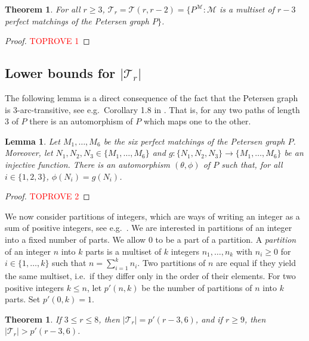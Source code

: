 \documentclass[a4paper,11pt]{article}
\newcommand{\ca}{\mathcal}
\newtheorem{theo}[defi]{Theorem}
\newtheorem{lem}[defi]{Lemma}
\theoremstyle{remark}
\begin{document}
\begin{theo}\label{Theorem-cong-P+M_V2}
	For all $r\ge 3$,
$\ca T_r = \ca T(r,r-2) = \{P^{\ca M}\colon \ca M $ is a multiset of $r-3$ perfect matchings of the Petersen graph $ P\}$.
\end{theo}

\begin{proof}\textcolor{red}{TOPROVE 1}\end{proof}

\subsection{Lower bounds for $|\ca T_r|$}

The following lemma is a direct consequence of the fact that the Petersen graph is 
3-arc-transitive, see e.g.~Corollary 1.8 in \cite{Babai_Handbook}.
That is, for any two paths of length 3 of $P$ there is an
automorphism of $P$ which maps one to the other. 


\begin{lem}\label{lem:autP_fixing_3_pm}
	Let $M_1,\dots,M_6$ be the six perfect matchings of the Petersen graph $P$. Moreover, let $N_1,N_2,N_3 \in \{M_1,\dots,M_6\}$ and $g\colon \{N_1,N_2,N_3\} \to \{M_1,\dots,M_6\}$ be an injective function. There is an automorphism $ (\theta,\phi) $ of $P$ such that, for all $i\in\{1,2,3\}$, $\phi(N_i)=g(N_i)$.
\end{lem}

\begin{proof}\textcolor{red}{TOPROVE 2}\end{proof}


We now consider partitions of integers, which are ways of writing an integer as a sum of positive integers, see e.g.~\cite{matouvsek2008invitation}. 
We are interested in partitions of an integer into a fixed number of parts.
We allow $0$ to be a part of a partition.
A \emph{partition} of an integer $n$ into $k$ parts is a multiset of $k$ integers
$n_1, \dots,n_k$ with $n_i \geq 0$ for $i \in \{1, \dots,k\}$ 
such that $n = \sum_{i=1}^k n_i$. Two partitions of $n$ are equal if
they yield the same multiset, i.e.\ if they differ only in the order of their elements. 
For two positive integers $k\le n$, let $p'(n,k)$ be the number of partitions of $n$ into $k$ parts. Set $p'(0,k)=1$.   

\begin{theo} \label{thm: lower bound S(r,r-2)}
If $3\leq r \leq 8$, then $|\ca T_r| = p'(r-3,6)$, and 
	if $r \geq 9$, then  $|\ca T_r| > p'(r-3,6)$.
\end{theo}
\end{document}
